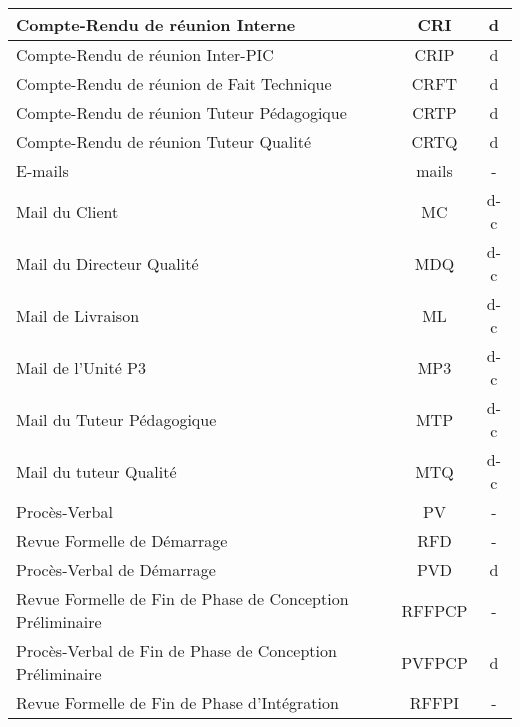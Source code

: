\begin{longtable}{|p{12cm}|c|c|}
    \hline
    \hspace{2cm} Compte-Rendu de réunion Interne & CRI & d\\
    \hline
    \hspace{2cm} Compte-Rendu de réunion Inter-PIC & CRIP & d\\
    \hline
    \hspace{2cm} Compte-Rendu de réunion de Fait Technique & CRFT & d\\
    \hline
    \hspace{2cm} Compte-Rendu de réunion Tuteur Pédagogique & CRTP & d\\
    \hline
    \hspace{2cm} Compte-Rendu de réunion Tuteur Qualité & CRTQ & d\\
    \hline
    \hspace{1cm} E-mails & mails & -\\
    \hline
    \hspace{2cm} Mail du Client & MC & d-c\\
    \hline
    \hspace{2cm} Mail du Directeur Qualité & MDQ & d-c\\
    \hline
    \hspace{2cm} Mail de Livraison & ML & d-c\\
    \hline
    \hspace{2cm} Mail de l'Unité P3 & MP3 & d-c\\
    \hline
    \hspace{2cm} Mail du Tuteur Pédagogique & MTP & d-c\\
    \hline
    \hspace{2cm} Mail du tuteur Qualité & MTQ & d-c\\
    \hline
    \hspace{1cm} Procès-Verbal & PV & -\\
    \hline
    \hspace{2cm} Revue Formelle de Démarrage & RFD & -\\
    \hline
    \hspace{3cm} Procès-Verbal de Démarrage & PVD & d\\
    \hline
    \hspace{2cm} Revue Formelle de Fin de Phase de Conception Préliminaire & RFFPCP & -\\
    \hline
    \hspace{3cm} Procès-Verbal de Fin de Phase de Conception Préliminaire & PVFPCP & d\\
    \hline
    \hspace{2cm} Revue Formelle de Fin de Phase d'Intégration & RFFPI & -\\

\end{longtable}
